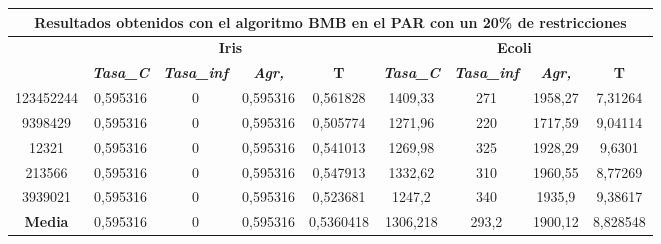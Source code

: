 \documentclass[12pt, spanish]{article}
\begin{document}
\begin{table}[H]
\begin{tabular}{|c|c|c|c|c|c|c|c|c|}
\hline
\multicolumn{9}{|c|}{\textbf{Resultados obtenidos con el algoritmo BMB en el PAR con un 20\% de restricciones}}                                                                                                   \\ \hline
\multirow{2}{*}{} & \multicolumn{4}{c|}{\textbf{Iris}}                                                            & \multicolumn{4}{c|}{\textbf{Ecoli}}                                                           \\ \cline{2-9} 
                  & \textit{\textbf{Tasa\_C}} & \textit{\textbf{Tasa\_inf}} & \textit{\textbf{Agr,}} & \textbf{T} & \textit{\textbf{Tasa\_C}} & \textit{\textbf{Tasa\_inf}} & \textit{\textbf{Agr,}} & \textbf{T} \\ \hline
123452244         & 0,595316                  & 0                           & 0,595316               & 0,561828   & 1409,33                   & 271                         & 1958,27                & 7,31264    \\ \hline
9398429           & 0,595316                  & 0                           & 0,595316               & 0,505774   & 1271,96                   & 220                         & 1717,59                & 9,04114    \\ \hline
12321             & 0,595316                  & 0                           & 0,595316               & 0,541013   & 1269,98                   & 325                         & 1928,29                & 9,6301     \\ \hline
213566            & 0,595316                  & 0                           & 0,595316               & 0,547913   & 1332,62                   & 310                         & 1960,55                & 8,77269    \\ \hline
3939021           & 0,595316                  & 0                           & 0,595316               & 0,523681   & 1247,2                    & 340                         & 1935,9                 & 9,38617    \\ \hline
\textbf{Media}    & 0,595316                  & 0                           & 0,595316               & 0,5360418  & 1306,218                  & 293,2                       & 1900,12                & 8,828548   \\ \hline
\end{tabular}
\end{table}
\end{document}
